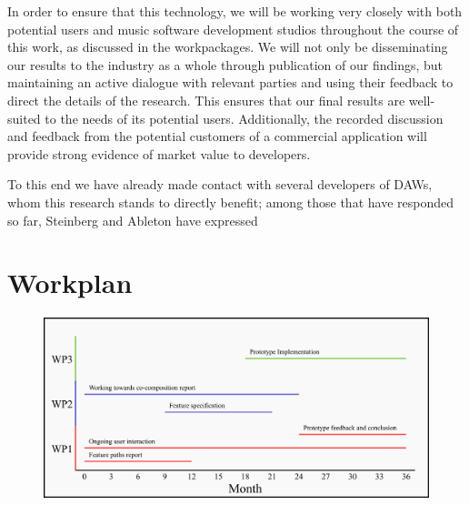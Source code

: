 \documentclass[11pt]{article}
\begin{document}
	In order to ensure that this technology, we will be working very closely with both potential users and music software development studios throughout the course of this work, as discussed in the workpackages. We will not only be disseminating our results to the industry as a whole through publication of our findings, but maintaining an active dialogue with relevant parties and using their feedback to direct the details of the research. This ensures that our final results are well-suited to the needs of its potential users. Additionally, the recorded discussion and feedback from the potential customers of a commercial application will provide strong evidence of market value to developers.
	
	To this end we have already made contact with several developers of DAWs, whom this research stands to directly benefit; among those that have responded so far, Steinberg and Ableton have expressed 
	
	\pagebreak
	\section{Workplan}
	
	\begin{figure}[h]
		\centering
		\includegraphics[width=1.0\textwidth]{gantt}
	\end{figure}
	
	\printbibliography
	
\end{document}
